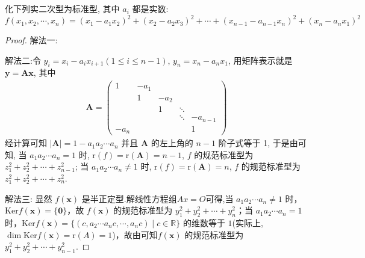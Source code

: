 \documentclass[../../main.tex]{subfiles}
\begin{document}
\begin{example}\label{example:例8.35}
化下列实二次型为标准型, 其中 \(a_i\) 都是实数:
\[f(x_1,x_2,\cdots,x_n)=(x_1 - a_1x_2)^2+(x_2 - a_2x_3)^2+\cdots+(x_{n - 1} - a_{n - 1}x_n)^2+(x_n - a_nx_1)^2\]
\end{example}
\begin{proof}
{\color{blue}解法一:}

{\color{blue}解法二:}令 \(y_i = x_i - a_ix_{i + 1}(1\leq i\leq n - 1)\), \(y_n = x_n - a_nx_1\), 用矩阵表示就是 \(\boldsymbol{y} = \boldsymbol{A}\boldsymbol{x}\), 其中
\begin{align*}
\boldsymbol{A} = \begin{pmatrix}
1 & -a_1 & & & \\
& 1 & -a_2 & & \\
& & 1 & \ddots & \\
& & & \ddots & -a_{n - 1} \\
-a_n & & & & 1
\end{pmatrix}
\end{align*}
经计算可知 \(|\boldsymbol{A}| = 1 - a_1a_2\cdots a_n\) 并且 \(\boldsymbol{A}\) 的左上角的 \(n - 1\) 阶子式等于 1, 于是由可知, 当 \(a_1a_2\cdots a_n = 1\) 时, \(\mathrm{r}(f)=\mathrm{r}(\boldsymbol{A}) = n - 1\), \(f\) 的规范标准型为 \(z_1^2 + z_2^2 + \cdots + z_{n - 1}^2\); 当 \(a_1a_2\cdots a_n\neq1\) 时, \(\mathrm{r}(f)=\mathrm{r}(\boldsymbol{A}) = n\), \(f\) 的规范标准型为 \(z_1^2 + z_2^2 + \cdots + z_n^2\).

{\color{blue}解法三:}
显然 $f(\boldsymbol{x})$ 是半正定型.解线性方程组$Ax=O$可得,当 $a_1a_2\cdots a_n\neq1$ 时，$\mathrm{Ker} f(\boldsymbol{x}) = \{\boldsymbol{0}\}$，故 $f(\boldsymbol{x})$ 的规范标准型为 $y_1^2 + y_2^2+\cdots + y_n^2$；当 $a_1a_2\cdots a_n = 1$ 时，$\mathrm{Ker} f(\boldsymbol{x})=\{(c,a_2\cdots a_n c,\cdots,a_n c)\mid c\in\mathbb{R}\}$ 的维数等于 $1$(实际上,$\dim \mathrm{Ker} f(\boldsymbol{x})=\mathrm{r}(A)=1$)，故由可知$f(\boldsymbol{x})$ 的规范标准型为 $y_1^2 + y_2^2+\cdots + y_{n - 1}^2$.
\end{proof}
\end{document}
